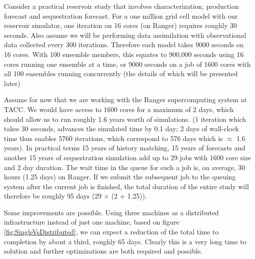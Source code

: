 \documentclass{acm_proc_article-sp}
\begin{document}
Consider a practical reservoir study that involves characterization,
production forecast and sequestration forecast. For a one million grid
cell model with our reservoir simulator, one iteration on 16 cores (on Ranger)
requires roughly 30 seconds. Also assume we will be performing data
assimilation with observational data collected every 300 iterations.
Therefore each model takes 9000 seconds on 16 cores. With 100 ensemble
members, this equates to 900,000 seconds using 16 cores running one
ensemble at a time, or 9000 seconds on a job of 1600 cores with all 100
ensembles running concurrently (the details of which will be presented
later)

Assume for now that we are working with the Ranger supercomputing
system at TACC. We would have access to 1600 cores for a maximum of 2
days, which should allow us to run roughly 1.6 years worth of
simulations. (1 iteration which takes 30 seconds, advances the
simulated time by 0.1 day; 2 days of wall-clock time thus enables 5760
iterations, which correspond to 576 days which is $\approx$ 1.6
years). In practical terms 15 years of history matching, 15 years of forecasts and
another 15 years of sequestration simulation add up to 29 jobs with
1600 core size and 2 day duration. The wait time in the queue for such
a job is, on average, 30 hours (1.25 days) on Ranger. If we submit the
subsequent job to the queuing system after the current job is
finished, the total duration of the entire study will therefore be
roughly 95 days (29 $\times$ (2 + 1.25)).

Some improvements are possible. Using three machines as a
distributed infrastructure instead of just one machine, based on figure
\ref{fig:SingleVsDistributed}, we can expect a reduction of the total
time to completion by about a third, roughly 65 days. Clearly this is
a very long time to solution and further optimizations are both
required and possible.

% 
\end{document}
